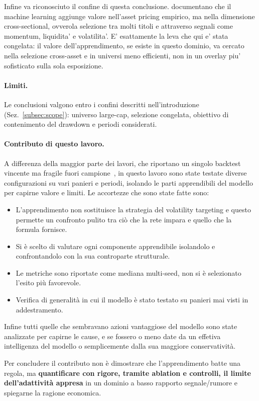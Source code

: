 Infine va riconosciuto il confine di questa conclusione. \citet{gu2020empirical}
documentano che il machine learning aggiunge valore nell'asset pricing
empirico, ma nella dimensione cross-sectional, ovverola selezione tra molti
titoli e attraverso segnali come momentum, liquidita' e volatilita'. E'
esattamente la leva che qui e' stata congelata: il valore dell'apprendimento, se
esiste in questo dominio, va cercato nella selezione cross-asset e in universi
meno efficienti, non in un overlay piu' sofisticato sulla sola esposizione.

\paragraph{Limiti.} Le conclusioni valgono entro i confini descritti
nell'introduzione (Sez.~\ref{subsec:scope}): universo large-cap, selezione
congelata, obiettivo di contenimento del drawdown e periodi considerati.

\paragraph{Contributo di questo lavoro.}
A differenza della maggior parte dei lavori, che riportano un singolo backtest vincente ma fragile fuori campione~\citep{bailey2014pseudo}, in questo lavoro sono state testate diverse configurazioni su vari panieri e periodi, isolando le parti apprendibili del modello per capirne valore e limiti.
Le accortezze che sono state fatte sono:
\begin{itemize}
    \item L'apprendimento non sostituisce la strategia del volatility targeting e questo permette un confronto pulito tra ciò che la rete impara e quello che la formula fornisce.
    \item Si è scelto di valutare ogni componente apprendibile isolandolo e confrontandolo con la sua controparte strutturale.
    \item Le metriche sono riportate come mediana multi-seed, non si è selezionato l'esito più favorevole.
    \item Verifica di generalità in cui il modello è stato testato su panieri mai visti in addestramento.
\end{itemize}

Infine tutti quelle che sembravano azioni vantaggiose del modello sono state analizzate per capirne le cause, e se fossero o meno date da un effetiva intelligenza del modello o semplicemente dalla sua maggiore conservatività.


Per concludere il contributo non è dimostrare che l'apprendimento batte una regola, ma \textbf{quantificare con rigore, tramite ablation e controlli, il limite dell'adattività appresa} in un dominio a basso rapporto segnale/rumore e spiegarne la ragione economica.
